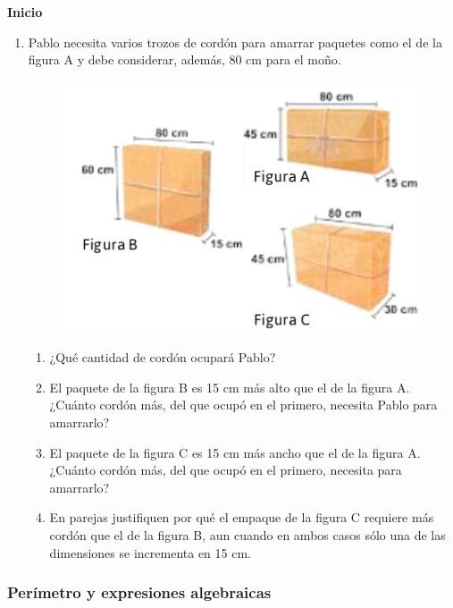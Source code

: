 \documentclass[11pt]{book}
\begin{document}
\begin{boxK}
  \begin{center}\textbf{Inicio}\end{center}

  \begin{enumerate}
    \item Pablo necesita varios trozos de cordón para amarrar paquetes como el de la figura A y
          debe considerar, además, 80 cm para el moño.
          \begin{figure}[H]
            \centering
            \includegraphics[width=.6\linewidth]{figuras_cajas.png}
            \label{fig:figuras_cajas}
          \end{figure}
          \begin{enumerate}
            \item ¿Qué cantidad de cordón ocupará Pablo?
            \item El paquete de la figura B es 15 cm más alto que el de la figura A. ¿Cuánto cordón más, del que ocupó en el primero, necesita Pablo para amarrarlo?
            \item El paquete de la figura C es 15 cm más ancho que el de la figura A. ¿Cuánto cordón más, del que ocupó en el primero, necesita para amarrarlo?
            \item En parejas justifiquen por qué el empaque de la figura C requiere más cordón que el de la figura B, aun cuando en ambos casos sólo una de las dimensiones se incrementa en 15 cm.
          \end{enumerate}
  \end{enumerate}
\end{boxK}

\subsubsection{Perímetro y expresiones algebraicas}
\end{document}
